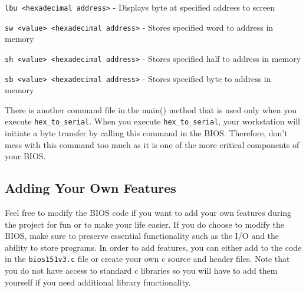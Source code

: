\documentclass[11pt]{article}
\begin{document}
\verb|lbu <hexadecimal address>| - Displays byte at specified address to screen

\verb|sw <value> <hexadecimal address>| - Stores specified word to address in memory

\verb|sh <value> <hexadecimal address>| - Stores specified half to address in memory

\verb|sb <value> <hexadecimal address>| - Stores specified byte to address in memory

There is another command file in the main() method that is used only when you execute
\verb|hex_to_serial|. When you execute \verb|hex_to_serial|, your workstation will initiate a byte
transfer by calling this command in the BIOS. Therefore, don’t mess with this command too
much as it is one of the more critical components of your BIOS.

\subsection{Adding Your Own Features}
Feel free to modify the BIOS code if you want to add your own features during the project for
fun or to make your life easier. If you do choose to modify the BIOS, make sure to preserve
essential functionality such as the I/O and the ability to store programs. In order to add
features, you can either add to the code in the \verb|bios151v3.c| file or create your own c source and
header files. Note that you do not have access to standard c libraries so you will have to add
them yourself if you need additional library functionality.
\end{document}
